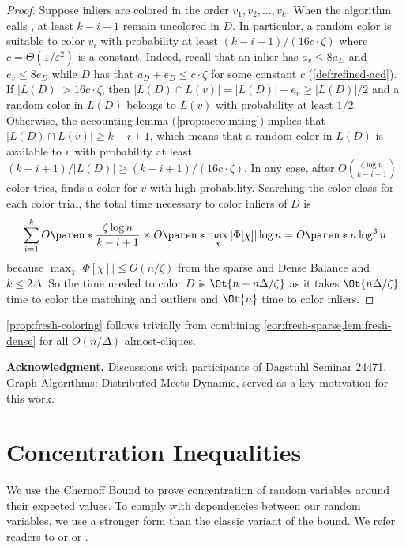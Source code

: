 \documentclass[a4paper,english,11pt]{amsart}
\renewcommand{\paragraph}[1]{\medskip\noindent\textbf{#1}}
\theoremstyle{definition}
\renewcommand{\leq}{\leqslant}
\renewcommand{\geq}{\geqslant}
\DeclarePairedDelimiter{\paren}()
\newcommand{\eps}{\varepsilon}
\begin{document}
\begin{proof}
Suppose inliers are colored in the order $v_1, v_2, \ldots, v_k$. When the algorithm calls , at least $k -i + 1$ remain uncolored in $D$. In particular, a random color is suitable to color $v_i$ with probability at least $(k - i + 1)/(16 c \cdot \zeta)$ where $c = \Theta(1/\eps^2)$ is a constant. Indeed, recall that an inlier has $a_v \leq 8a_D$ and $e_v \leq 8e_D$ while $D$ has that $a_D + e_D \leq c \cdot \zeta$ for some constant $c$ (\cref{def:refined-acd}). If $|L(D)| > 16c \cdot \zeta$, then $|L(D) \cap L(v)| = |L(D)| - e_v \geq |L(D)|/2$ and a random color in $L(D)$ belongs to $L(v)$ with probability at least $1/2$. Otherwise, the accounting lemma (\cref{prop:accounting}) implies that $|L(D) \cap L(v)| \geq k - i + 1$, which means that a random color in $L(D)$ is available to $v$ with probability at least $(k - i + 1)/|L(D)| \geq (k - i + 1)/(16c \cdot \zeta)$. In any case, after $O(\frac{\zeta\log n}{k - i + 1})$ color tries, \ColorDense finds a color for $v$ with high probability. Searching the color class for each color trial, the total time necessary to color inliers of $D$ is
\[
\sum_{i=1}^k O\paren*{ \frac{\zeta \log n}{k - i + 1} }
    \times O\paren*{ \max_{\chi} |\Phi[\chi]| \log n }
= O\paren*{ n \log^3 n }
\]
because $\max_\chi|\Phi[\chi]| \leq O(n/\zeta)$ from the sparse and Dense Balance and $k\leq 2\Delta$. So the time needed to color $D$ is $\Ot{ n + n\Delta/\zeta }$ as it takes $\Ot{ n\Delta/\zeta }$ time to color the matching and outliers and $\Ot{n}$ time to color inliers.
\end{proof}

\cref{prop:fresh-coloring} follows trivially from combining \cref{cor:fresh-sparse,lem:fresh-dense} for all $O(n/\Delta)$ almost-cliques.

 
\paragraph{Acknowledgment.}
Discussions with participants of Dagstuhl Seminar 24471, Graph Algorithms: Distributed Meets Dynamic, served as a key motivation for this work.





\appendix




\section{Concentration Inequalities}
We use the Chernoff Bound to prove concentration of random variables around their expected values. To comply with dependencies between our random variables, we use a stronger form than the classic variant of the bound. We refer readers to \cite{DP09} or \cite[Section 1.10]{Doerr2020} or \cite[Corollaries 6 and 14]{KQ21}.
\end{document}
